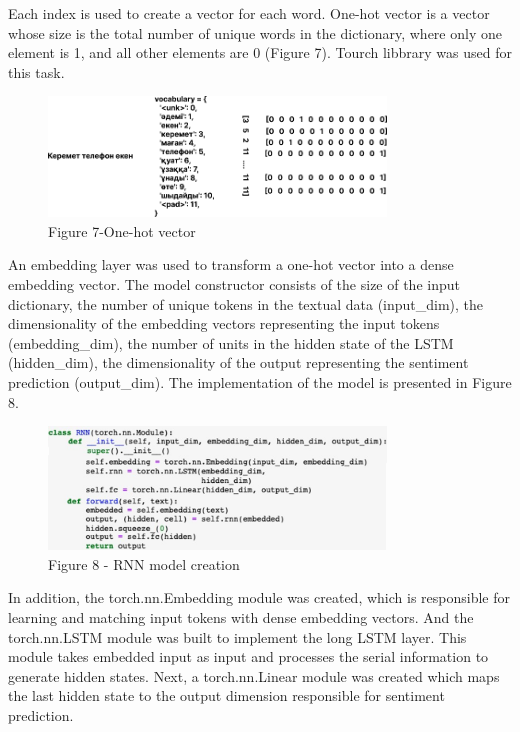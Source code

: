 Each index is used to create a vector for each word. One-hot vector is a
vector whose size is the total number of unique words in the dictionary,
where only one element is 1, and all other elements are 0 (Figure 7).
Tourch libbrary was used for this task.

\begin{figure}[H]
	\centering
	\includegraphics[width=0.8\textwidth]{media/ict/image14}
	\caption*{Figure 7-One-hot vector}
\end{figure}

An embedding layer was used to transform a one-hot vector into a dense
embedding vector. The model constructor consists of the size of the
input dictionary, the number of unique tokens in the textual data
(input\_dim), the dimensionality of the embedding vectors representing
the input tokens (embedding\_dim), the number of units in the hidden
state of the LSTM (hidden\_dim), the dimensionality of the output
representing the sentiment prediction (output\_dim). The implementation
of the model is presented in Figure 8.

\begin{figure}[H]
	\centering
	\includegraphics[width=0.8\textwidth]{media/ict/image15}
	\caption*{Figure 8 - RNN model creation}
\end{figure}

In addition, the torch.nn.Embedding module was created, which is
responsible for learning and matching input tokens with dense embedding
vectors. And the torch.nn.LSTM module was built to implement the long
LSTM layer. This module takes embedded input as input and processes the
serial information to generate hidden states. Next, a torch.nn.Linear
module was created which maps the last hidden state to the output
dimension responsible for sentiment prediction.

